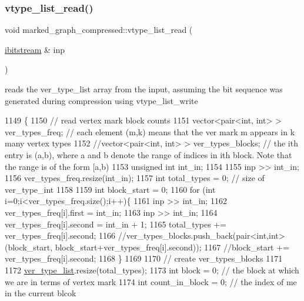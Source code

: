 \subsubsection{\texorpdfstring{vtype\+\_\+list\+\_\+read()}{vtype\_list\_read()}}
{\footnotesize\ttfamily void marked\+\_\+graph\+\_\+compressed\+::vtype\+\_\+list\+\_\+read (\begin{DoxyParamCaption}\item[{\hyperlink{classibitstream}{ibitstream} \&}]{inp }\end{DoxyParamCaption})}



reads the ver\+\_\+type\+\_\+list array from the input, assuming the bit sequence was generated during compression using vtype\+\_\+list\+\_\+write 


\begin{DoxyCode}
1149                                                             \{
1150   \textcolor{comment}{// read vertex mark block counts}
1151   vector<pair<int, int> > ver\_types\_freq; \textcolor{comment}{// each element (m,k) means that the ver mark m appears in k many
       vertex types}
1152   \textcolor{comment}{//vector<pair<int, int> > ver\_types\_blocks; // the ith entry is (a,b), where a and b denote the range of
       indices in ith block. Note that the range is of the form [a,b)}
1153   \textcolor{keywordtype}{unsigned} \textcolor{keywordtype}{int} int\_in;
1154 
1155   inp >> int\_in;
1156   ver\_types\_freq.resize(int\_in);
1157   \textcolor{keywordtype}{int} total\_types = 0; \textcolor{comment}{// size of ver\_type\_int}
1158 
1159   \textcolor{keywordtype}{int} block\_start = 0;
1160   \textcolor{keywordflow}{for} (\textcolor{keywordtype}{int} i=0;i<ver\_types\_freq.size();i++)\{
1161     inp >> int\_in;
1162     ver\_types\_freq[i].first = int\_in;
1163     inp >> int\_in;
1164     ver\_types\_freq[i].second  = int\_in + 1;
1165     total\_types += ver\_types\_freq[i].second;
1166     \textcolor{comment}{//ver\_types\_blocks.push\_back(pair<int,int>(block\_start, block\_start+ver\_types\_freq[i].second));}
1167     \textcolor{comment}{//block\_start += ver\_types\_freq[i].second;}
1168   \}
1169 
1170   \textcolor{comment}{// create ver\_types\_blocks}
1171 
1172   \hyperlink{classmarked__graph__compressed_af2e3e55223d436628a02758dfae88493}{ver\_type\_list}.resize(total\_types);
1173   \textcolor{keywordtype}{int} block = 0; \textcolor{comment}{// the block at which we are in terms of vertex mark}
1174   \textcolor{keywordtype}{int} count\_in\_block = 0; \textcolor{comment}{// the index of me in the current blcok}

\end{DoxyCode}

